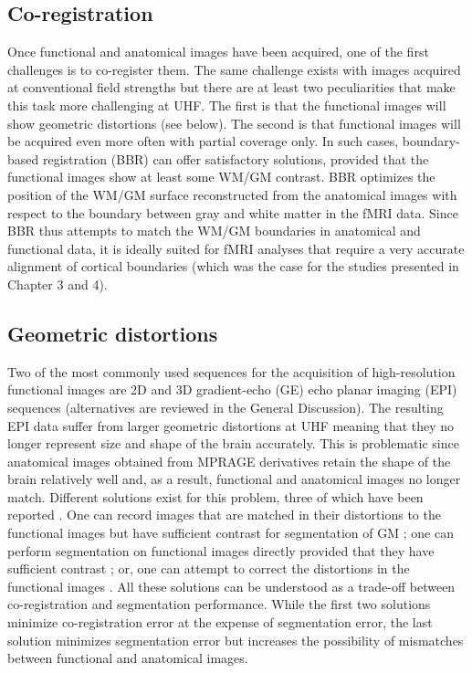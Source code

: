 \subsection{Co-registration}
Once functional and anatomical images have been acquired, one of the first challenges is to co-register them. The same challenge exists with images acquired at conventional field strengths but there are at least two peculiarities that make this task more challenging at UHF. The first is that the functional images will show geometric distortions (see below). The second is that functional images will be acquired even more often with partial coverage only. In such cases, boundary-based registration (BBR) \parencite{Greve2009} can offer satisfactory solutions, provided that the functional images show at least some WM/GM contrast. BBR optimizes the position of the WM/GM surface reconstructed from the anatomical images with respect to the boundary between gray and white matter in the fMRI data. Since BBR thus attempts to match the WM/GM boundaries in anatomical and functional data, it is ideally suited for fMRI analyses that require a very accurate alignment of cortical boundaries \parencite{Polimeni2017} (which was the case for the studies presented in Chapter 3 and 4).

\subsection{Geometric distortions}
Two of the most commonly used sequences for the acquisition of high-resolution functional images are 2D \parencite{Feinberg2010, Moeller2010, Setsompop2012} and 3D \parencite{Poser2010} gradient-echo (GE) echo planar imaging (EPI) sequences (alternatives are reviewed in the General Discussion). The resulting EPI data suffer from larger geometric distortions at UHF meaning that they no longer represent size and shape of the brain accurately. This is problematic since anatomical images obtained from MPRAGE derivatives retain the shape of the brain relatively well and, as a result, functional and anatomical images no longer match. Different solutions exist for this problem, three of which have been reported \parencite{DeMartino2016}. One can record images that are matched in their distortions to the functional images but have sufficient contrast for segmentation of GM \parencite{Renvall2016, Kashyap2017}; one can perform segmentation on functional images directly provided that they have sufficient contrast \parencite{Fracasso2016}; or, one can attempt to correct the distortions in the functional images \parencite{Emmerling2016, Marquardt2018}. All these solutions can be understood as a trade-off between co-registration and segmentation performance. While the first two solutions minimize co-registration error at the expense of segmentation error, the last solution minimizes segmentation error but increases the possibility of mismatches between functional and anatomical images.

